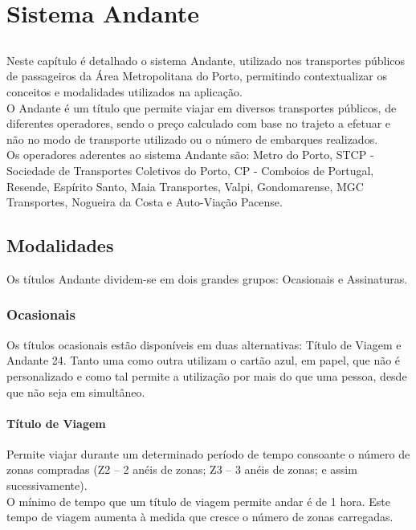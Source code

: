 \chapter{Sistema Andante}\label{chap:andante}

\section*{}

Neste capítulo é detalhado o sistema Andante, utilizado nos transportes públicos de passageiros da Área Metropolitana do Porto, permitindo contextualizar os conceitos e modalidades utilizados na aplicação.
\\O Andante é um título que permite viajar em diversos transportes públicos, de diferentes operadores, sendo o preço calculado com base no trajeto a efetuar e não no modo de transporte utilizado ou o número de embarques realizados.
\\Os operadores aderentes ao sistema Andante são: Metro do Porto, STCP - Sociedade de Transportes Coletivos do Porto, CP - Comboios de Portugal, Resende, Espírito Santo, Maia Transportes, Valpi, Gondomarense, MGC Transportes, Nogueira da Costa e Auto-Viação Pacense. 

\section{Modalidades}

Os títulos Andante dividem-se em dois grandes grupos: Ocasionais e Assinaturas.

\subsection{Ocasionais}

Os títulos ocasionais estão disponíveis em duas alternativas: Título de Viagem e Andante 24. Tanto uma como outra utilizam o cartão azul, em papel, que não é personalizado e como tal permite a utilização por mais do que uma pessoa, desde que não seja em simultâneo.

\subsubsection{Título de Viagem}

Permite viajar durante um determinado período de tempo consoante o número de zonas compradas (Z2 – 2 anéis de zonas; Z3 – 3 anéis de zonas; e assim sucessivamente).
\\O mínimo de tempo que um título de viagem permite andar é de 1 hora. Este tempo de viagem aumenta à medida que cresce o número de zonas carregadas.

